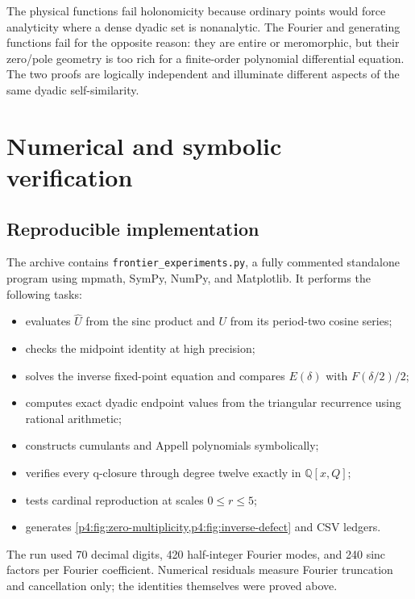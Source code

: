 \documentclass[11pt]{article}
\numberwithin{equation}{section}
\theoremstyle{definition}
\theoremstyle{remark}
\newcommand{\Q}{\mathbb Q}
\begin{document}
\begin{corpusdeductionbox}[title=Two-sided holonomic exclusion]
The physical functions fail holonomicity because ordinary points would force analyticity where a dense dyadic set is nonanalytic.  The Fourier and generating functions fail for the opposite reason: they are entire or meromorphic, but their zero/pole geometry is too rich for a finite-order polynomial differential equation.  The two proofs are logically independent and illuminate different aspects of the same dyadic self-similarity.
\end{corpusdeductionbox}

\section{Numerical and symbolic verification}
\label{p4:sec:numerics}

\subsection{Reproducible implementation}
The archive contains \texttt{frontier\_experiments.py}, a fully commented standalone program using mpmath, SymPy, NumPy, and Matplotlib.  It performs the following tasks:
\begin{itemize}
\item evaluates $\widehat U$ from the sinc product and $U$ from its period-two cosine series;
\item checks the midpoint identity at high precision;
\item solves the inverse fixed-point equation and compares $E(\delta)$ with $F(\delta/2)/2$;
\item computes exact dyadic endpoint values from the triangular recurrence using rational arithmetic;
\item constructs cumulants and Appell polynomials symbolically;
\item verifies every q-closure through degree twelve exactly in $\Q[x,Q]$;
\item tests cardinal reproduction at scales $0\le r\le5$;
\item generates \cref{p4:fig:zero-multiplicity,p4:fig:inverse-defect} and CSV ledgers.
\end{itemize}
The run used 70 decimal digits, 420 half-integer Fourier modes, and 240 sinc factors per Fourier coefficient.  Numerical residuals measure Fourier truncation and cancellation only; the identities themselves were proved above.
\end{document}
